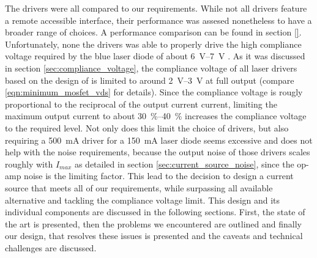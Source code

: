 The drivers were all compared to our requirements. While not all drivers feature a remote accessible interface, their performance was assesed nonetheless to have a broader range of choices. A performance comparison can be found in section \ref{}. Unfortunately, none the drivers was able to properly drive the high compliance voltage required by the blue laser diode  of about \qtyrange[range-units = single]{6}{7}{\V} \cite{datasheet_osram_pl450b}. As it was discussed in section \ref{sec:compliance_voltage}, the compliance voltage of all laser drivers based on the design of \citeauthor{libbrecht_hall} \cite{libbrecht_hall} is limited to around \qtyrange[range-units = single]{2}{3}{\V} at full output (compare \ref{eqn:minimum_mosfet_vds} for details). Since the compliance voltage is rougly proportional to the reciprocal of the output current current, limiting the maximum output current to about \qtyrange[range-units = single]{30}{40}{\percent} increases the compliance voltage to the required level. Not only does this limit the choice of drivers, but also requiring a \qty{500}{\mA} driver for a \qty{150}{\mA} laser diode seems excessive and does not help with the noise requirements, because the output noise of those drivers scales roughly with $I_{max}$ as detailed in section \ref{sec:current_source_noise}, since the op-amp noise is the limiting factor. This lead to the decision to design a current source that meets all of our requirements, while surpassing all available alternative and tackling the compliance voltage limit. This design and its individual components are discussed in the following sections. First, the state of the art is presented, then the problems we encountered are outlined and finally our design, that resolves these issues is presented and the caveats and technical challenges are discussed.

